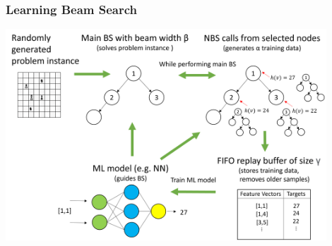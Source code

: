 \documentclass[aspectratio=1610]{beamer}
\newcommand{\important}[1]{{\color{green!60!black}#1}}
\begin{document}
									


	
\begin{frame}
\frametitle{Learning Beam Search \citep{huber-21}}
	\begin{center}
		\includegraphics[height=225pt]{graphics/lbsProcedure.png}
	\end{center}
\end{frame}
	
\end{document}

